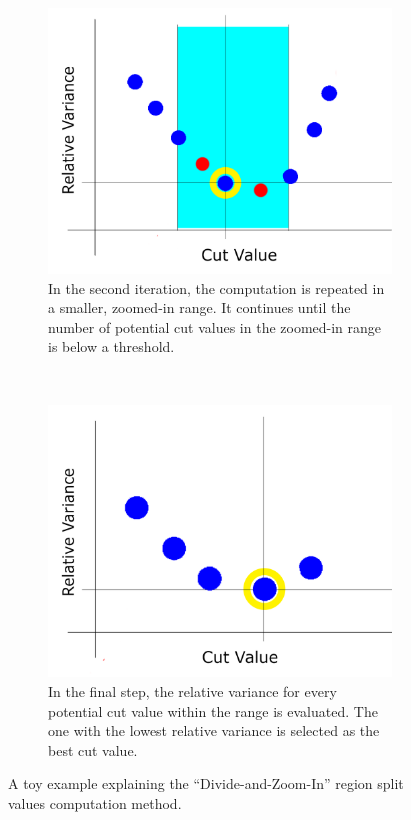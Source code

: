 \begin{figure}[!htbp]
	\begin{subfigure}[t]{0.45\textwidth}
		\centering
		\includegraphics[width=1.0 \textwidth]{"fig/cbla/divide-and-zoom-in_3"}
		\caption{In the second iteration, the computation is repeated in a smaller, zoomed-in range. It continues until the number of potential cut values in the zoomed-in range is below a threshold.}
		\label{fig:divide-and-zoom-in_3}
	\end{subfigure}
	~
	\begin{subfigure}[t]{0.45\textwidth}
		\centering
		\includegraphics[width=1.0 \textwidth]{"fig/cbla/divide-and-zoom-in_4"}
		\caption{In the final step, the relative variance for every potential cut value within the range is evaluated. The one with the lowest relative variance is selected as the best cut value.}
		\label{fig:divide-and-zoom-in_4}
	\end{subfigure}
	\caption[Illustrations explaining the ``Divide-and-Zoom-In'' region split values computation method]{A toy example explaining the ``Divide-and-Zoom-In'' region split values computation method.}
	\label{fig:divide-and-zoom-in}
\end{figure}

